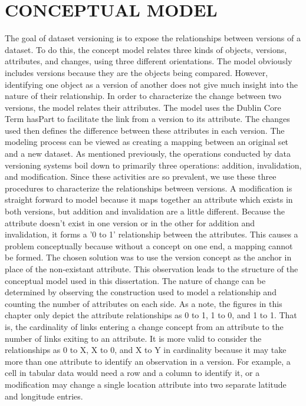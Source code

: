 
\chapter{CONCEPTUAL MODEL}\label{ch:model}

The goal of dataset versioning is to expose the relationships between versions of a dataset.
To do this, the concept model relates three kinds of objects, versions, attributes, and changes, using three different orientations.
The model obviously includes versions because they are the objects being compared.
However, identifying one object as a version of another does not give much insight into the nature of their relationship.
In order to characterize the change between two versions, the model relates their attributes.
The model uses the Dublin Core Term hasPart to facilitate the link from a version to its attribute.
The changes used then defines the difference between these attributes in each version.
The modeling process can be viewed as creating a mapping between an original set and a new dataset.
As mentioned previously, the operations conducted by data versioning systems boil down to primarily three operations: addition, invalidation, and modification.
Since these activities are so prevalent, we use these three procedures to characterize the relationships between versions.
A modification is straight forward to model because it maps together an attribute which exists in both versions, but addition and invalidation are a little different.
Because the attribute doesn't exist in one version or in the other for addition and invalidation, it forms a '0 to 1' relationship between the attributes.
This causes a problem conceptually because without a concept on one end, a mapping cannot be formed.
The chosen solution was to use the version concept as the anchor in place of the non-existant attribute.
This observation leads to the structure of the conceptual model used in this dissertation.
The nature of change can be determined by observing the construction used to model a relationship and counting the number of attributes on each side.
As a note, the figures in this chapter only depict the attribute relationships as 0 to 1, 1 to 0, and 1 to 1.
That is, the cardinality of links entering a change concept from an attribute to the number of links exiting to an attribute.
It is more valid to consider the relationships as 0 to X, X to 0, and X to Y in cardinality because it may take more than one attribute to identify an observation in a version.
For example, a cell in tabular data would need a row and a column to identify it, or a modification may change a single location attribute into two separate latitude and longitude entries.


